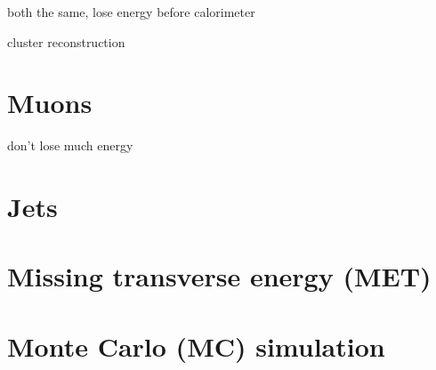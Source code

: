 both the same, lose energy before calorimeter

cluster reconstruction

\section{Muons}
\label{sec:muons_reco}

don't lose much energy


\section{Jets}
\label{sec:jets_reco}

\section{Missing transverse energy (MET)}
\label{sec:met_reco}

\section{Monte Carlo (MC) simulation}
\label{sec:mc_reco}

